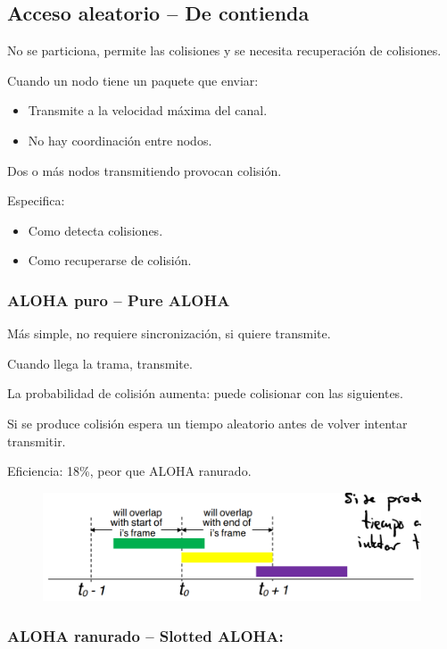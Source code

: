\documentclass[12pt, twoside, openright]{report} %
\begin{document}
\subsection{Acceso aleatorio -- De contienda}
No se particiona, permite las
colisiones y se necesita recuperación de colisiones.


Cuando un nodo tiene un paquete que enviar:

\begin{itemize}
	\item Transmite a la velocidad máxima del canal.
	\item No hay coordinación entre nodos.
\end{itemize}

Dos o más nodos transmitiendo provocan colisión.

Especifica:

\begin{itemize}
	\item Como detecta colisiones.
	\item Como recuperarse de colisión.
\end{itemize}
\subsubsection{ALOHA puro -- Pure ALOHA}


Más simple, no requiere sincronización, si quiere transmite.

Cuando llega la trama, transmite.

La probabilidad de colisión aumenta: puede colisionar con las
siguientes.

Si se produce colisión espera un tiempo aleatorio antes de
volver intentar transmitir.

Eficiencia: 18\%, peor que ALOHA ranurado.
\begin{figure}[H]
	{\includegraphics[scale=.25]{Untitled 50.png}}
\end{figure}

\subsubsection{ALOHA ranurado -- Slotted ALOHA:}
\end{document}
